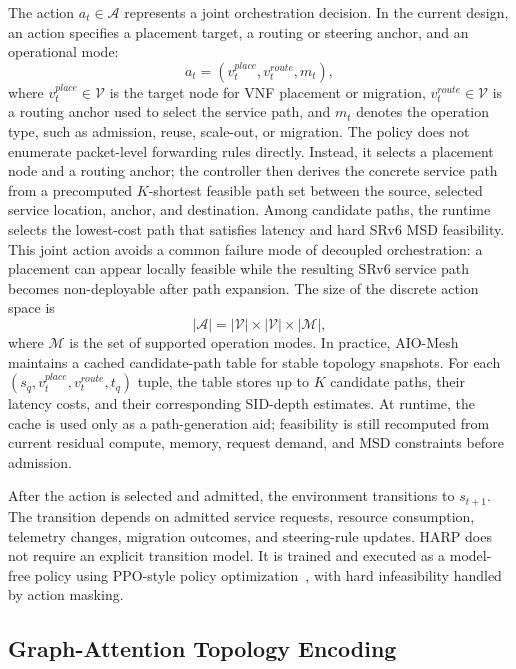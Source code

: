 \documentclass[final,5p]{elsarticle}
\begin{document}
The action \(a_t \in \mathcal{A}\) represents a joint orchestration decision. In the current design, an action specifies a placement target, a routing or steering anchor, and an operational mode:
\begin{equation}
    a_t = \left(v^{place}_t, v^{route}_t, m_t\right),
\end{equation}
where \(v^{place}_t \in \mathcal{V}\) is the target node for VNF placement or migration, \(v^{route}_t \in \mathcal{V}\) is a routing anchor used to select the service path, and \(m_t\) denotes the operation type, such as admission, reuse, scale-out, or migration. The policy does not enumerate packet-level forwarding rules directly. Instead, it selects a placement node and a routing anchor; the controller then derives the concrete service path from a precomputed \(K\)-shortest feasible path set between the source, selected service location, anchor, and destination. Among candidate paths, the runtime selects the lowest-cost path that satisfies latency and hard SRv6 MSD feasibility. This joint action avoids a common failure mode of decoupled orchestration: a placement can appear locally feasible while the resulting SRv6 service path becomes non-deployable after path expansion.
The size of the discrete action space is
\begin{equation}
    |\mathcal{A}| = |\mathcal{V}| \times |\mathcal{V}| \times |\mathcal{M}|,
\end{equation}
where \(\mathcal{M}\) is the set of supported operation modes. In practice, AIO-Mesh maintains a cached candidate-path table for stable topology snapshots. For each \((s_q,v^{place}_t,v^{route}_t,t_q)\) tuple, the table stores up to \(K\) candidate paths, their latency costs, and their corresponding SID-depth estimates. At runtime, the cache is used only as a path-generation aid; feasibility is still recomputed from current residual compute, memory, request demand, and MSD constraints before admission.

After the action is selected and admitted, the environment transitions to \(s_{t+1}\). The transition depends on admitted service requests, resource consumption, telemetry changes, migration outcomes, and steering-rule updates. HARP does not require an explicit transition model. It is trained and executed as a model-free policy using PPO-style policy optimization~\cite{schulman2017proximal}, with hard infeasibility handled by action masking.

\subsection{Graph-Attention Topology Encoding}
\label{subsec:harp_gat}
\end{document}
